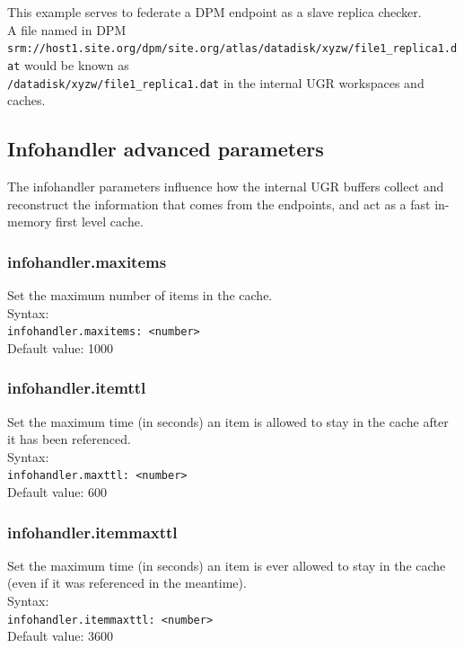 \documentclass[12pt]{article} %
\begin{document}
This example serves to federate a DPM endpoint as a slave replica checker.\\
A file named in DPM \\
\lstinline"srm://host1.site.org/dpm/site.org/atlas/datadisk/xyzw/file1_replica1.dat" would be known as \\
\lstinline"/datadisk/xyzw/file1_replica1.dat" in the internal UGR workspaces and caches.





\subsection{Infohandler advanced parameters}
The infohandler parameters influence how the internal UGR buffers collect  and reconstruct the information that comes from the endpoints, and act as a fast in-memory first level cache.



\subsubsection{infohandler.maxitems}
Set the maximum number of items in the cache.\\
Syntax:\\
\lstinline"infohandler.maxitems: <number>"\\

Default value: 1000

\subsubsection{infohandler.itemttl}
Set the maximum time (in seconds) an item is allowed to stay in the cache after it has been referenced.\\
Syntax:\\
\lstinline"infohandler.maxttl: <number>"\\
Default value: 600



\subsubsection{infohandler.itemmaxttl}
Set the maximum time (in seconds) an item is ever allowed to stay in the cache (even if it was referenced in the meantime).\\
Syntax:\\
\lstinline"infohandler.itemmaxttl: <number>"\\
Default value: 3600
\end{document}
